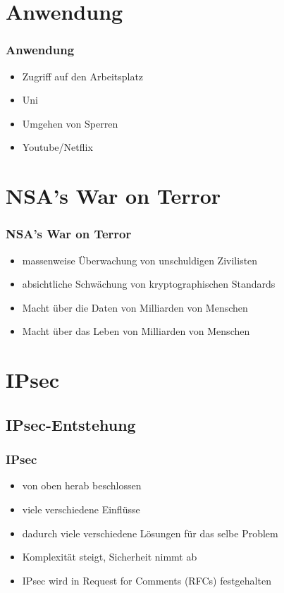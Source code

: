 \documentclass[t]{beamer}
\begin{document}
\section{Anwendung}
\begin{frame}
	\frametitle{Anwendung}
	\begin{itemize}
		\vfill
		\item Zugriff auf den Arbeitsplatz
		\vfill
		\item Uni
		\vfill
		\item Umgehen von Sperren
		\vfill
		\item Youtube/Netflix
	\end{itemize}
\end{frame}

\section{NSA's War on Terror}
\begin{frame}
	\frametitle{NSA's War on Terror}
	\begin{itemize}
		\vfill
		\item massenweise Überwachung von unschuldigen Zivilisten
		\vfill
		\item absichtliche Schwächung von kryptographischen Standards
		\vfill
		\item Macht über die Daten von Milliarden von Menschen
		\vfill
		\item Macht über das Leben von Milliarden von Menschen
		\vfill
	\end{itemize}

	
\end{frame}

\section{IPsec}
\subsection*{IPsec-Entstehung}
\begin{frame}
	\frametitle{IPsec}
	\begin{itemize}
		\vfill
		\item von oben herab beschlossen
		\vfill
		\item viele verschiedene Einflüsse
		\vfill
		\item dadurch viele verschiedene Lösungen für das selbe Problem
		\vfill
		\item Komplexität steigt, Sicherheit nimmt ab
		\vfill
		\item IPsec wird in Request for Comments (RFCs) festgehalten
		\vfill
	\end{itemize}
\end{frame}
\end{document}
